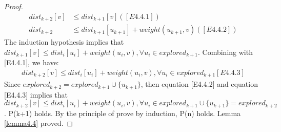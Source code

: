 \begin{proof}
\begin{align*}
  dist_{k+2}[v] &\leq dist_{k+1}[v] ([E4.4.1])\\
  dist_{k+2} &\leq dist_{k+1}[u_{k+1}] + weight(u_{k+1}, v)([E4.4.2])
\end{align*}
The induction hypothesis implies that $dist_{k+1}[v] \leq dist_i[u_i] + weight(u_i, v), \forall u_i \in explored_{k+1}$. Combining with [E4.4.1], we have: 
\begin{align*}
dist_{k+2}[v] \leq dist_i[u_i] + weight(u_i, v), \forall u_i \in explored_{k+1} [E4.4.3]
\end{align*}
Since $explored_{k+2} = explored_{k+1} \cup \{u_{k+1}\}$, then equation [E4.4.2] and equation [E4.4.3] implies that $dist_{k+2}[v] \leq dist_i[u_i] + weight(u_i, v), \forall u_i \in explored_{k+1} \cup \{u_{k+1}\} = explored_{k+2}$. P(k+1) holds. By the principle of prove by induction, P(n) holds. Lemma \ref{lemma4.4} proved. 
\end{proof}
\tab\\
